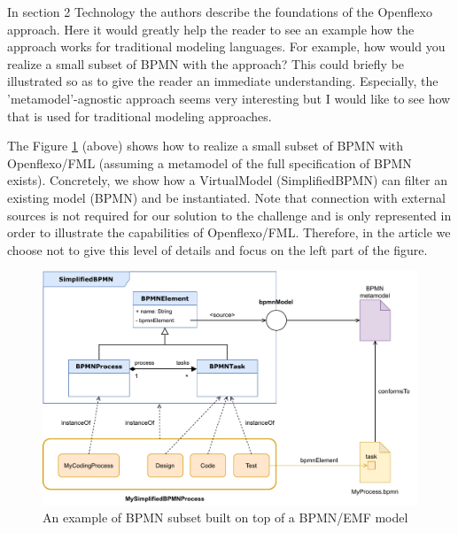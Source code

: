 \documentclass[10pt]{article}
\begin{document}
\begin{response}{In section 2 Technology the authors describe the foundations of the Openflexo approach. Here it would greatly help the reader to see an example how the approach works for traditional modeling languages. For example, how would you realize a small subset of BPMN with the approach? This could briefly be illustrated so as to give the reader an immediate understanding. Especially, the 'metamodel'-agnostic approach seems very interesting but I would like to see how that is used for traditional modeling approaches.}

The Figure \ref{fig:BPMNSubsetExample} (above) shows how to realize a small subset of BPMN with Openflexo/FML (assuming a metamodel of the full specification of BPMN exists). Concretely, we show  how a VirtualModel (SimplifiedBPMN) can filter an existing model (BPMN) and be instantiated. Note that connection with external sources is not required for our solution to the challenge and is only represented in order to illustrate the capabilities of Openflexo/FML. Therefore, in the article we choose not to give this level of details and focus on the left part of the figure. 


\begin{figure}[t]
    \centering
    \includegraphics[width=1.0 \textwidth]{Figures/BPMNSubsetExampleWithExternalConnexion.pdf}
    \caption{An example of BPMN subset built on top of a BPMN/EMF model}
    \label{fig:BPMNSubsetExample}
\end{figure}


\end{response}
\end{document}
